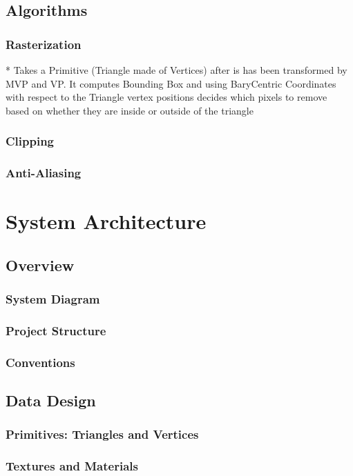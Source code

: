 \documentclass{article}
\begin{document}
\subsection{Algorithms}
\subsubsection{Rasterization}
* Takes a Primitive (Triangle made of Vertices) after is has been transformed by MVP and VP. It computes Bounding Box and using BaryCentric Coordinates with respect to the Triangle vertex positions decides which pixels to remove based on whether they are inside or outside of the triangle
\subsubsection{Clipping}
\subsubsection{Anti-Aliasing}

\section{System Architecture}

\subsection{Overview}
\subsubsection{System Diagram}
\subsubsection{Project Structure}
\subsubsection{Conventions}

\subsection{Data Design}
\subsubsection{Primitives: Triangles and Vertices}
\subsubsection{Textures and Materials}
\end{document}
